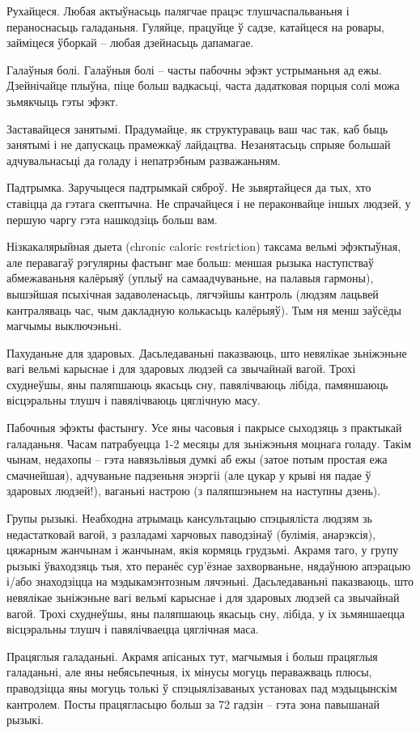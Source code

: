 Рухайцеся.
Любая актыўнасьць палягчае працэс тлушчаспальваньня і пераноснасьць галаданьня. Гуляйце, працуйце ў садзе, катайцеся на ровары, займіцеся ўборкай – любая дзейнасьць дапамагае.

Галаўныя болі.
Галаўныя болі – часты пабочны эфэкт устрыманьня ад ежы. Дзейнічайце плыўна, піце больш вадкасьці, часта дадатковая порцыя солі можа зьмякчыць гэты эфэкт.

Заставайцеся занятымі.
Прадумайце, як структураваць ваш час так, каб быць занятымі і не дапускаць прамежкаў лайдацтва. Незанятасьць спрыяе большай адчувальнасьці да голаду і непатрэбным разважаньням.

Падтрымка.
Заручыцеся падтрымкай сяброў. Не зьвяртайцеся да тых, хто ставіцца да гэтага скептычна. Не спрачайцеся і не пераконвайце іншых людзей, у першую чаргу гэта нашкодзіць больш вам.

Нізкакалярыйная дыета (chronic caloric restriction) таксама вельмі эфэктыўная, але перавагаў рэгулярны фастынг мае больш: меншая рызыка наступстваў абмежаваньня калёрыяў (уплыў на самаадчуваньне, на палавыя гармоны), вышэйшая псыхічная задаволенасьць, лягчэйшы кантроль (людзям лацьвей кантраляваць час, чым дакладную колькасьць калёрыяў). Тым ня менш заўсёды магчымы выключэньні.

Пахуданьне для здаровых.
Дасьледаваньні паказваюць, што невялікае зьніжэньне вагі вельмі карыснае і для здаровых людзей са звычайнай вагой. Трохі схуднеўшы, яны паляпшаюць якасьць сну, павялічваюць лібіда, памяншаюць вісцэральны тлушч і павялічваюць цяглічную масу.

Пабочныя эфэкты фастынгу.
Усе яны часовыя і пакрысе сыходзяць з практыкай галаданьня. Часам патрабуецца 1-2 месяцы для зьніжэньня моцнага голаду. Такім чынам, недахопы – гэта навязьлівыя думкі аб ежы (затое потым простая ежа смачнейшая), адчуваньне падзеньня энэргіі (але цукар у крыві ня падае ў здаровых людзей!), ваганьні настрою (з паляпшэньнем на наступны дзень).

Групы рызыкі.
Неабходна атрымаць кансультацыю спэцыяліста людзям зь недастатковай вагой, з разладамі харчовых паводзінаў (булімія, анарэксія), цяжарным жанчынам і жанчынам, якія кормяць грудзьмі. Акрамя таго, у групу рызыкі ўваходзяць тыя, хто перанёс сур'ёзнае захворваньне, нядаўнюю апэрацыю і/або знаходзіцца на мэдыкамэнтозным лячэньні.
Дасьледаваньні паказваюць, што невялікае зьніжэньне вагі вельмі карыснае і для здаровых людзей са звычайнай вагой. Трохі схуднеўшы, яны паляпшаюць якасьць сну, лібіда, у іх зьмяншаецца вісцэральны тлушч і павялічваецца цяглічная маса.

Працяглыя галаданьні.
Акрамя апісаных тут, магчымыя і больш працяглыя галаданьні, але яны небясьпечныя, іх мінусы могуць пераважваць плюсы, праводзіцца яны могуць толькі ў спэцыялізаваных установах пад мэдыцынскім кантролем. Посты працягласьцю больш за 72 гадзін – гэта зона павышанай рызыкі.
